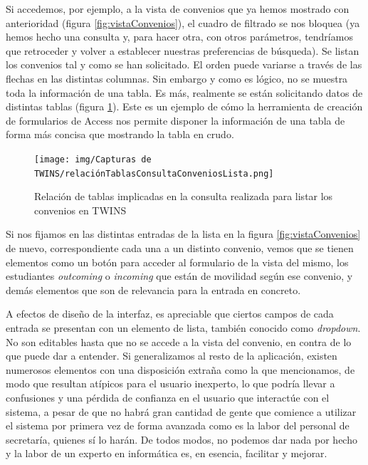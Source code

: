 Si accedemos, por ejemplo, a la vista de convenios que ya hemos mostrado con anterioridad (figura \ref{fig:vistaConvenios}), el cuadro de filtrado se nos bloquea (ya hemos hecho una consulta y, para hacer otra, con otros parámetros, tendríamos que retroceder y volver a establecer nuestras preferencias de búsqueda). Se listan los convenios tal y como se han solicitado. El orden puede variarse a través de las flechas en las distintas columnas. Sin embargo y como es lógico, no se muestra toda la información de una tabla. Es más, realmente se están solicitando datos de distintas tablas (figura \ref{fig:tablasConsultaConvenios}). Este es un ejemplo de cómo la herramienta de creación de formularios de Access nos permite disponer la información de una tabla de forma más concisa que mostrando la tabla en crudo.

\begin{figure}
	\centering
	\texttt{[image: img/Capturas de TWINS/relaciónTablasConsultaConveniosLista.png]}
	\caption[Tablas implicadas en consultar convenios en TWINS]{Relación de tablas implicadas en la consulta realizada para listar los convenios en TWINS}
	\label{fig:tablasConsultaConvenios}
\end{figure}

Si nos fijamos en las distintas entradas de la lista en la figura \ref{fig:vistaConvenios} de nuevo, correspondiente cada una a un distinto convenio, vemos que se tienen elementos como un botón para acceder al formulario de la vista del mismo, los estudiantes \textit{outcoming} o \textit{incoming} que están de movilidad según ese convenio, y demás elementos que son de relevancia para la entrada en concreto.

A efectos de diseño de la interfaz, es apreciable que ciertos campos de cada entrada se presentan con un elemento de lista, también conocido como \textit{dropdown}. No son editables hasta que no se accede a la vista del convenio, en contra de lo que puede dar a entender. Si generalizamos al resto de la aplicación, existen numerosos elementos con una disposición extraña como la que mencionamos, de modo que resultan atípicos para el usuario inexperto, lo que podría llevar a confusiones y una pérdida de confianza en el usuario que interactúe con el sistema, a pesar de que no habrá gran cantidad de gente que comience a utilizar el sistema por primera vez de forma avanzada como es la labor del personal de secretaría, quienes sí lo harán. De todos modos, no podemos dar nada por hecho y la labor de un experto en informática es, en esencia, facilitar y mejorar.

